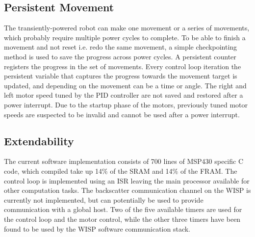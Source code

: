 \subsection{Persistent Movement}
The transiently-powered robot can make one movement or a series of movements, which probably require multiple power cycles to complete.
To be able to finish a movement and not reset i.e. redo the same movement, a simple checkpointing method is used to save the progress across power cycles.
A persistent counter registers the progress in the set of movements.
Every control loop iteration the persistent variable that captures the progress towards the movement target is updated, and depending on the movement can be a time or angle.
The right and left motor speed tuned by the PID controller are not saved and restored after a power interrupt.
Due to the startup phase of the motors, previously tuned motor speeds are suspected to be invalid and cannot be used after a power interrupt. 

\subsection{Extendability}
The current software implementation consists of 700 lines of MSP430 specific C code, which compiled take up 14\% of the SRAM and 14\% of the FRAM.
The control loop is implemented using an ISR leaving the main processor available for other computation tasks.
The backscatter communication channel on the WISP is currently not implemented, but can potentially be used to provide communication with a global host. 
Two of the five available timers are used for the control loop and the motor control, while the other three timers have been found to be used by the WISP software communication stack.
 

